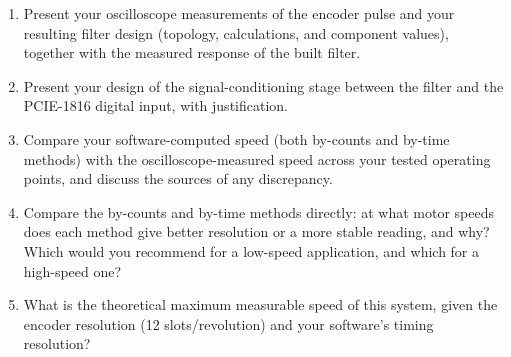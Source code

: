 \begin{reportq}
  \begin{enumerate}
    \item Present your oscilloscope measurements of the encoder pulse and your resulting filter design (topology, calculations, and component values), together with the measured response of the built filter.
    \item Present your design of the signal-conditioning stage between the filter and the PCIE-1816 digital input, with justification.
    \item Compare your software-computed speed (both by-counts and by-time methods) with the oscilloscope-measured speed across your tested operating points, and discuss the sources of any discrepancy.
    \item Compare the by-counts and by-time methods directly: at what motor speeds does each method give better resolution or a more stable reading, and why? Which would you recommend for a low-speed application, and which for a high-speed one?
    \item What is the theoretical maximum measurable speed of this system, given the encoder resolution (12 slots/revolution) and your software's timing resolution?
  \end{enumerate}
\end{reportq}

